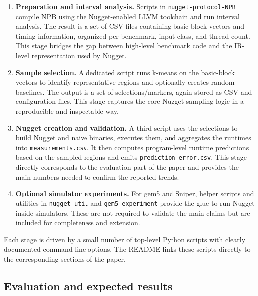 \begin{enumerate}
  \item \textbf{Preparation and interval analysis.}  
        Scripts in \texttt{nugget-protocol-NPB} compile NPB using the Nugget-enabled LLVM toolchain and run interval analysis.  
        The result is a set of CSV files containing basic-block vectors and timing information, organized per benchmark, input class, and thread count.  
        This stage bridges the gap between high-level benchmark code and the IR-level representation used by Nugget.

  \item \textbf{Sample selection.}  
        A dedicated script runs k-means on the basic-block vectors to identify representative regions and optionally creates random baselines.  
        The output is a set of selections/markers, again stored as CSV and configuration files.  
        This stage captures the core Nugget sampling logic in a reproducible and inspectable way.

  \item \textbf{Nugget creation and validation.}  
        A third script uses the selections to build Nugget and naive binaries, executes them, and aggregates the runtimes into \texttt{measurements.csv}.  
        It then computes program-level runtime predictions based on the sampled regions and emits \texttt{prediction-error.csv}.  
        This stage directly corresponds to the evaluation part of the paper and provides the main numbers needed to confirm the reported trends.

  \item \textbf{Optional simulator experiments.}  
        For gem5 and Sniper, helper scripts and utilities in \texttt{nugget\_util} and \texttt{gem5-experiment} provide the glue to run Nugget inside simulators.  
        These are not required to validate the main claims but are included for completeness and extension.
\end{enumerate}

Each stage is driven by a small number of top-level Python scripts with clearly documented command-line options. The README links these scripts directly to the corresponding sections of the paper.

\subsection{Evaluation and expected results}


